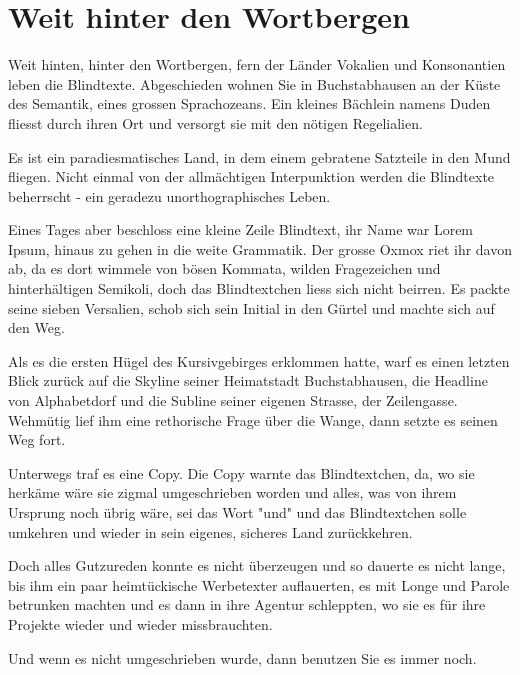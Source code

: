 \chapter{Weit hinter den Wortbergen}
\label{cha:wortberge}


Weit hinten, hinter den Wortbergen, fern der Länder Vokalien und Konsonantien leben die Blindtexte. Abgeschieden wohnen Sie in Buchstabhausen an der Küste des Semantik, eines grossen Sprachozeans. Ein kleines Bächlein namens Duden fliesst durch ihren Ort und versorgt sie mit den nötigen Regelialien.

Es ist ein paradiesmatisches Land, in dem einem gebratene Satzteile in den Mund fliegen. Nicht einmal von der allmächtigen Interpunktion werden die Blindtexte beherrscht - ein geradezu unorthographisches Leben.

Eines Tages aber beschloss eine kleine Zeile Blindtext, ihr Name war Lorem Ipsum, hinaus zu gehen in die weite Grammatik. Der grosse Oxmox riet ihr davon ab, da es dort wimmele von bösen Kommata, wilden Fragezeichen und hinterhältigen Semikoli, doch das Blindtextchen liess sich nicht beirren. Es packte seine sieben Versalien, schob sich sein Initial in den Gürtel und machte sich auf den Weg.

Als es die ersten Hügel des Kursivgebirges erklommen hatte, warf es einen letzten Blick zurück auf die Skyline seiner Heimatstadt Buchstabhausen, die Headline von Alphabetdorf und die Subline seiner eigenen Strasse, der Zeilengasse. Wehmütig lief ihm eine rethorische Frage über die Wange, dann setzte es seinen Weg fort.

Unterwegs traf es eine Copy. Die Copy warnte das Blindtextchen, da, wo sie herkäme wäre sie zigmal umgeschrieben worden und alles, was von ihrem Ursprung noch übrig wäre, sei das Wort "und" und das Blindtextchen solle umkehren und wieder in sein eigenes, sicheres Land zurückkehren.

Doch alles Gutzureden konnte es nicht überzeugen und so dauerte es nicht lange, bis ihm ein paar heimtückische Werbetexter auflauerten, es mit Longe und Parole betrunken machten und es dann in ihre Agentur schleppten, wo sie es für ihre Projekte wieder und wieder missbrauchten.

Und wenn es nicht umgeschrieben wurde, dann benutzen Sie es immer noch.


\textbf{}


